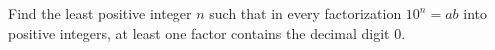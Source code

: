 Find the least positive integer $n$ such that in every factorization $10^n=ab$ into positive integers, at least one factor contains the decimal digit $0$.
